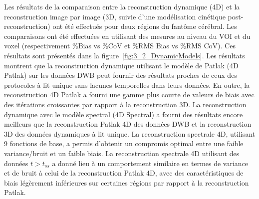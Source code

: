 \documentclass[a4paper]{article}
\begin{document}
Les résultats de la comparaison entre la reconstruction dynamique (4D) et la reconstruction image par image (3D, suivie d'une modélisation cinétique post-reconstruction) ont été effectués pour deux régions du fantôme cérébral. Les comparaisons ont été effectuées en utilisant des mesures au niveau du VOI et du voxel (respectivement \%Bias vs \%CoV et \%RMS Bias vs \%RMS CoV). Ces résultats sont présentés dans la figure~\ref{fig:3_2_DynamicModels}.
Les résultats montrent que la reconstruction dynamique utilisant le modèle de Patlak (4D Patlak) sur les données DWB peut fournir des résultats proches de ceux des protocoles à lit unique sans lacunes temporelles dans leurs données. En outre, la reconstruction 4D Patlak a fourni une gamme plus courte de valeurs de biais avec des itérations croissantes par rapport à la reconstruction 3D. La reconstruction dynamique avec le modèle spectral (4D Spectral) a fourni des résultats encore meilleurs que la reconstruction Patlak 4D des données DWB et la reconstruction 3D des données dynamiques à lit unique. La reconstruction spectrale 4D, utilisant 9 fonctions de base, a permis d'obtenir un compromis optimal entre une faible variance/bruit et un faible biais. La reconstruction spectrale 4D utilisant des données $t > t_{ss}$ a donné lieu à un comportement similaire en termes de variance et de bruit à celui de la reconstruction Patlak 4D, avec des caractéristiques de biais légèrement inférieures sur certaines régions par rapport à la reconstruction Patlak.
\end{document}
